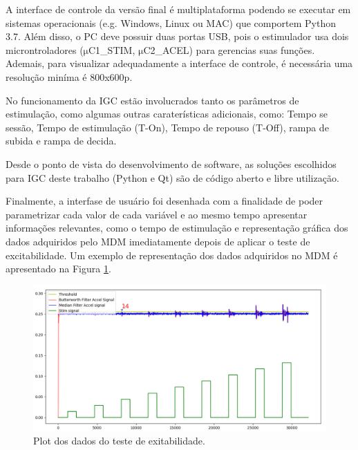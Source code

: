 A interface de controle da versão final é multiplataforma podendo se executar em sistemas operacionais (e.g. Windows, Linux ou MAC) que comportem Python 3.7. Além disso, o \acrshort{PC} deve possuir duas portas USB, pois o estimulador usa dois microntroladores ($\mathrm{\mu}$C1\_STIM, $\mathrm{\mu}$C2\_ACEL) para gerencias suas funções. Ademais, para visualizar adequadamente a interface de controle, é necessária uma resolução miníma é 800x600p.

No funcionamento da \acrshort{IGC} estão involucrados tanto os parâmetros de estimulação, como algumas outras caraterísticas adicionais, como: Tempo se sessão, Tempo de estimulação (T-On), Tempo de repouso (T-Off), rampa de subida e rampa de decida.

Desde o ponto de vista do desenvolvimento de software, as soluções escolhidos para \acrshort{IGC} deste trabalho (Python e Qt) são de código aberto e libre utilização.

Finalmente, a interfase de usuário foi desenhada com a finalidade de poder parametrizar cada valor de cada variável e ao mesmo tempo apresentar informações relevantes, como o tempo de estimulação e representação gráfica dos dados adquiridos pelo \acrshort{MDM} imediatamente depois de aplicar o teste de excitabilidade. Um exemplo de representação dos dados adquiridos no \acrshort{MDM}  é apresentado na Figura \ref{fig:c4_f31_xte}.

\begin{figure}
    \centering %
    \includegraphics[width=1\linewidth]{figs/Fig_c4/c4_f31_xte}
    \caption{Plot dos dados do teste de exitabilidade.}
    \label{fig:c4_f31_xte}
\end{figure}
